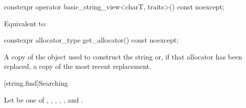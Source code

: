 %
\begin{itemdecl}
constexpr operator basic_string_view<charT, traits>() const noexcept;
\end{itemdecl}

\begin{itemdescr}
\pnum
\effects
Equivalent to:
\end{itemdescr}

%
\begin{itemdecl}
constexpr allocator_type get_allocator() const noexcept;
\end{itemdecl}

\begin{itemdescr}
\pnum
\returns
A copy of the
object used to construct the string or, if that allocator has been replaced, a
copy of the most recent replacement.
\end{itemdescr}

[string.find]{Searching}

\pnum
{}%
%
%
%
%
%
Let  be one of
, , , ,
, and .

